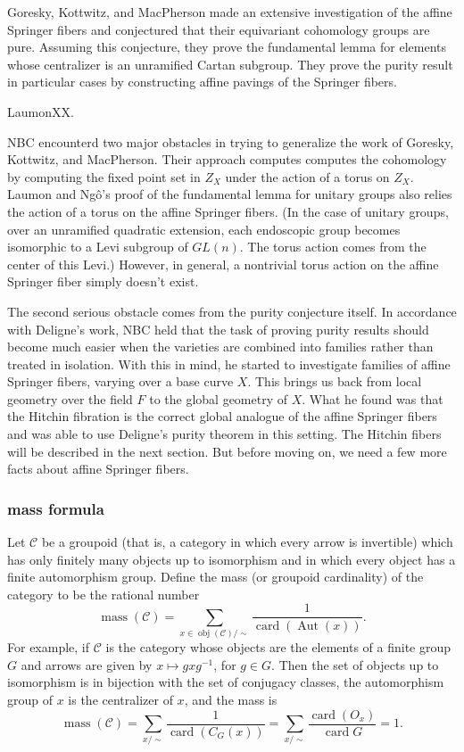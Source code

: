 \documentclass[brochure,english,12pt]{bourbaki}
\def\op#1{{\operatorname{#1}}}
\def\mass{\op{mass}}
\def\card{\op{card}}
\def\C{{\mathcal C}}
\begin{document}
Goresky, Kottwitz, and MacPherson made an extensive investigation of
the affine Springer fibers and conjectured that their equivariant
cohomology groups are pure.  Assuming this conjecture, they prove the
fundamental lemma for elements whose centralizer is an unramified
Cartan subgroup.  They prove the purity result in particular cases by
constructing affine pavings of the Springer fibers.

LaumonXX.

NBC encounterd two major obstacles in trying to generalize the work of
Goresky, Kottwitz, and MacPherson.  Their approach computes computes
the cohomology by computing the fixed point set in $Z_X$ under the
action of a torus on $Z_X$.  Laumon and Ng\^o's proof of the
fundamental lemma for unitary groups also relies the action of a torus
on the affine Springer fibers.  (In the case of unitary groups, over
an unramified quadratic extension, each endoscopic group becomes
isomorphic to a Levi subgroup of $GL(n)$.  The torus action comes from
the center of this Levi.)  However, in general, a nontrivial torus
action on the affine Springer fiber simply doesn't exist.

The second serious obstacle comes from the purity conjecture itself.
In accordance with Deligne's work, NBC held that the task of proving
purity results should become much easier when the varieties are
combined into families rather than treated in isolation.  With this in
mind, he started to investigate families of affine Springer fibers,
varying over a base curve $X$.  This brings us back from local
geometry over the field $F$ to the global geometry of $X$.  What he
found was that the Hitchin fibration is the correct global analogue of
the affine Springer fibers and was able to use Deligne's  purity theorem in this setting.  
The Hitchin fibers will be described in
the next section.  But before moving on, we need a few more facts
about affine Springer fibers.

\subsubsection{mass formula}

Let ${\C}$ be a groupoid (that is, a category in which every arrow is
invertible) which has only finitely many objects up to isomorphism and
in which every object has a finite automorphism group.  Define the
mass (or groupoid cardinality) of the category to be the rational
number
\[
\mass(\C)= \sum_{x\in \op{obj}(\C)/\sim} \frac{1}{\op{card}(\op{Aut}(x))}.
\]
For example, if ${\C}$ is the category whose objects are the elements of a finite group $G$
and arrows are given by $x \mapsto g x g^{-1}$, for $g\in G$.  Then the set of objects up to
isomorphism is in bijection with the set of conjugacy classes, the automorphism group of $x$ is the
centralizer of $x$,  and the mass is
\[
\mass(\C) = \sum_{x/\sim} \frac{1}{\op{card}(C_G(x))} = 
\sum_{x/\sim} \frac{\op{card}(O_x)}{\card{G}} = 1.
\]
\end{document}
